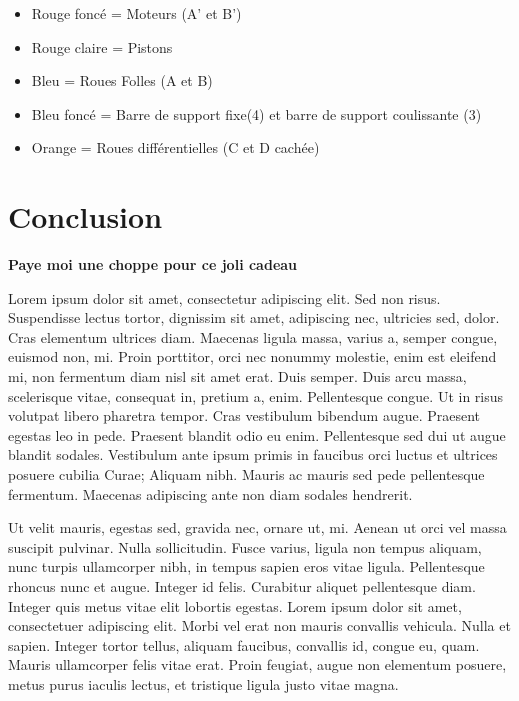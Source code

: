 \documentclass{report}
\begin{document}
\begin{multicols}{2}
\begin{itemize}
 \item Rouge foncé = Moteurs (A' et B')
 \item Rouge claire = Pistons
 \item Bleu = Roues Folles (A et B)
 \item Bleu foncé = Barre de support fixe(4) et barre de support coulissante (3)
 \item Orange = Roues différentielles (C et D cachée)
 \end{itemize}
 \end{multicols}







\chapter*{Conclusion}


\textbf{\textbf{Paye moi une choppe pour ce joli cadeau}}

Lorem ipsum dolor sit amet, consectetur adipiscing elit. Sed non risus. Suspendisse lectus tortor, dignissim sit amet, adipiscing nec, ultricies sed, dolor. Cras elementum ultrices diam. Maecenas ligula massa, varius a, semper congue, euismod non, mi. Proin porttitor, orci nec nonummy molestie, enim est eleifend mi, non fermentum diam nisl sit amet erat. Duis semper. Duis arcu massa, scelerisque vitae, consequat in, pretium a, enim. Pellentesque congue. Ut in risus volutpat libero pharetra tempor. Cras vestibulum bibendum augue. Praesent egestas leo in pede. Praesent blandit odio eu enim. Pellentesque sed dui ut augue blandit sodales. Vestibulum ante ipsum primis in faucibus orci luctus et ultrices posuere cubilia Curae; Aliquam nibh. Mauris ac mauris sed pede pellentesque fermentum. Maecenas adipiscing ante non diam sodales hendrerit.

Ut velit mauris, egestas sed, gravida nec, ornare ut, mi. Aenean ut orci vel massa suscipit pulvinar. Nulla sollicitudin. Fusce varius, ligula non tempus aliquam, nunc turpis ullamcorper nibh, in tempus sapien eros vitae ligula. Pellentesque rhoncus nunc et augue. Integer id felis. Curabitur aliquet pellentesque diam. Integer quis metus vitae elit lobortis egestas. Lorem ipsum dolor sit amet, consectetuer adipiscing elit. Morbi vel erat non mauris convallis vehicula. Nulla et sapien. Integer tortor tellus, aliquam faucibus, convallis id, congue eu, quam. Mauris ullamcorper felis vitae erat. Proin feugiat, augue non elementum posuere, metus purus iaculis lectus, et tristique ligula justo vitae magna.
\end{document}

